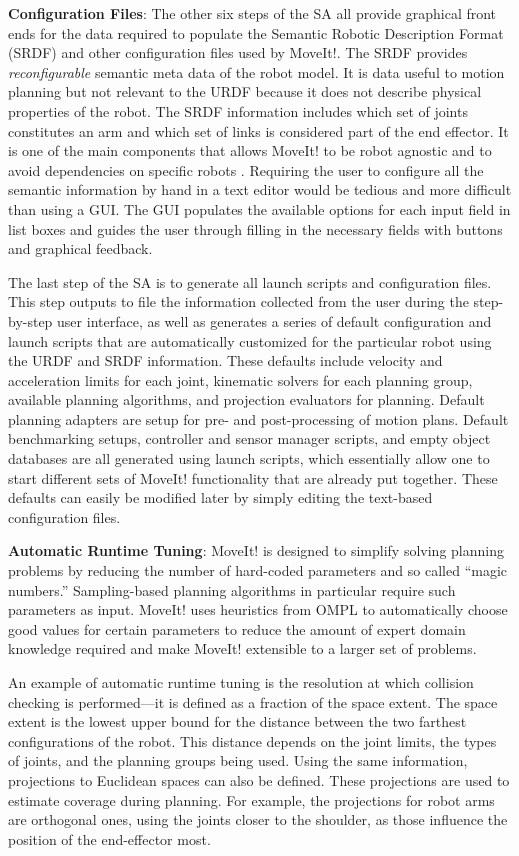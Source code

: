 \documentclass[10pt,journal,compsoc]{joser1}
\begin{document}
{{\bf Configuration Files}: The other six steps of the SA all provide graphical front ends for the data required to populate the Semantic Robotic Description Format (SRDF) and other configuration files used by MoveIt!. The SRDF provides \textit{reconfigurable} semantic meta data of the robot model. It is data useful to motion planning but not relevant to the URDF because it does not describe physical properties of the robot. The SRDF information includes which set of joints constitutes an arm and which set of links is considered part of the end effector. It is one of the main components that allows MoveIt! to be robot agnostic and to avoid dependencies on specific robots \cite{moveit}. Requiring the user to configure all the semantic information by hand in a text editor would be tedious and more difficult than using a GUI. The GUI populates the available options for each input field in list boxes and guides the user through filling in the necessary fields with buttons and graphical feedback.

The last step of the SA is to generate all launch scripts and configuration files. This step outputs to file the information collected from the user during the step-by-step user interface, as well as generates a series of default configuration and launch scripts that are automatically customized for the particular robot using the URDF and SRDF information. These defaults include velocity and acceleration limits for each joint, kinematic solvers for each planning group, available planning algorithms, and projection evaluators for planning. Default planning adapters are setup for pre- and post-processing of motion plans. Default benchmarking setups, controller and sensor manager scripts, and empty object databases are all generated using launch scripts, which essentially allow one to start different sets of MoveIt! functionality that are already put together. These defaults can easily be modified later by simply editing the text-based configuration files.

{\bf Automatic Runtime Tuning}: MoveIt! is designed to simplify solving planning problems by reducing the number of hard-coded parameters and so called ``magic numbers.'' Sampling-based planning algorithms in particular require such parameters as input. MoveIt! uses heuristics from OMPL to automatically choose good values for certain parameters to reduce the amount of expert domain knowledge required and make MoveIt! extensible to a larger set of problems. 

An example of automatic runtime tuning is the resolution at which collision checking is performed---it is defined as a fraction of the space extent. The space extent is the lowest upper bound for the distance between the two farthest configurations of the robot. This distance depends on the joint limits, the types of joints, and the planning groups being used. Using the same information, projections to Euclidean spaces can also be defined. These projections are used to estimate coverage during planning. For example, the projections for robot arms are orthogonal ones, using the joints closer to the shoulder, as those influence the position of the end-effector most.  

}
\end{document}
